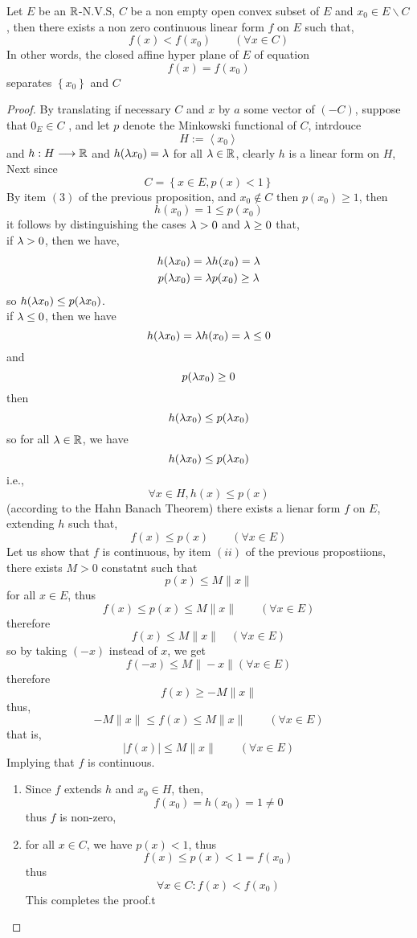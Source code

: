 \begin{corollary}[]
Let $E $ be an $\mathbb{R} $-N.V.S, $C$ be a non empty open convex subset of $E$ 
and $x_0 \in  E \backslash C $, then there exists a non zero continuous linear 
form $f $ on $E$ such that, 
\[
f(x) <  f(x_0) \quad \quad \left( 
	\forall x \in  C
\right)
\]
In other words, the closed affine hyper plane of $E$ of equation 
\[
f(x) = f(x_0) 
\] 
separates $\left\{ x_0 \right\} $ and $C$
\end{corollary}
\begin{proof}
By translating if necessary $C $ and $x$   
by $a $ some vector of $(-C)  $, suppose that $0_{E} \in C$ , 
and let $p $ denote the Minkowski functional of $C $, intrdouce 
\[
H:= \left\langle x_0 \right\rangle 
\]
and $ h :H  \longrightarrow  \mathbb{R}  $ and 
$h(\lambda x_0) = \lambda $ for all $\lambda \in  \mathbb{R}  $, clearly $h $ is a linear 
form on $H $, Next since 
\[
C =
\left\{ 
	x \in  E, 
	p(x) < 1
\right\}
\]
By item $(3)$ of the previous proposition, 
and $x_0 \notin C $ then $p(x_0) \geq 1 $, then 
\[
h(x_0)  = 1 \leq p(x_0) 
\]  
it follows by distinguishing the cases $\lambda > 0 $ and 
$\lambda \geq 0 $ that,  \\
if $\lambda > 0 $, then we have, 
\begin{align*}
	h( \lambda x_{0})  &= 
	\lambda h(x_0) = \lambda \\
	p( \lambda x_0)  &= 
	\lambda p(x_0)  \geq  \lambda
\end{align*}
so $h(\lambda x_0) \leq p( \lambda x_0)  $. 
\\
if $\lambda \leq 0  $, then we have 
\[
	h ( \lambda x_0)  = \lambda h(x_0)  = \lambda \leq 0
\] 
and 
\[
p (\lambda x_0)  \geq 0
\]
then 
\[
h ( \lambda x_0)  \leq  p( \lambda x_0) 
\]
so for all $\lambda \in  \mathbb{R}  $, we have 
\[
h ( \lambda x_0)  \leq p ( \lambda x_0) 
\]
i.e., 
\[
\forall  x \in  H, 
h(x) \leq p(x) 
\]
(according to the Hahn Banach Theorem) there exists a lienar form $f $ on 
$E $, extending $h $ such that, 
\[
f(x)  \leq  p(x) \quad \quad 
\left( \forall  x \in E \right)
\] 
Let us show that $f $ is continuous, by item $(ii)$ of the previous propostiions, there exists
$M > 0 $ constatnt such that 
\[
p(x) \leq  M \| x \| 
\]
for all $x \in  E $, thus 
\[
	f(x) \leq p(x) \leq M \| x \|    \quad \quad 
	\left( 
		\forall  x \in E
	\right)
\]
therefore 
\[
f(x)  \leq M \| x \| \quad \left( 
	\forall x \in  E
\right)
\] 
so by taking $(-x)$ instead of $x $, we get 
\[
f(-x) \leq  M \| -x \|  \left( 
\forall  x \in  E\right)
\]
therefore 
\[
f(x) \geq - M \| x \| 
\]
thus, 
\[
-M \| x \| \leq f(x)  \leq  M \| x \| \quad  \quad 
\left( 
	\forall  x \in  E
\right)
\]
that is, 
\[
\left| f(x)  \right| \leq M \| x \|  \quad \quad 
\left( 
	\forall  x \in E
\right)
\]
Implying that $f $ is continuous.  \\
\begin{enumerate}
\item 
Since $f $ extends $h $ and $x_0 \in  H $, then, 
\[
f(x_0)  = h(x_0)  = 1 \neq 0
\]
thus $f $ is non-zero, 
\item  
for all $x \in  C$,  we have $p(x) <  1 $, thus 
\[
f(x)  \leq  p(x)  <  1 = f(x_0) 
\]
thus 
\[
\forall  x \in  C : f(x)  <  f(x_0) 
\]
This completes the proof.t
\end{enumerate}
\end{proof}
% 
